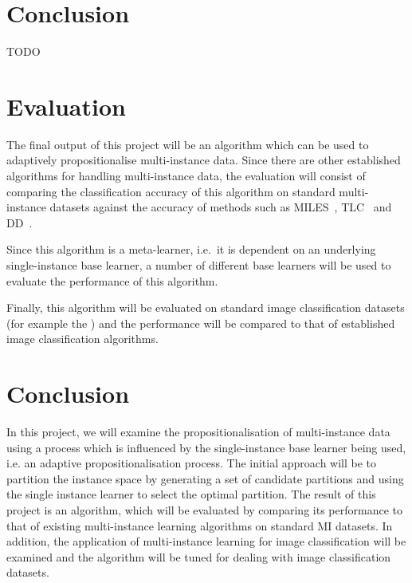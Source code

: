 \documentclass[a4paper,12pt]{article} %
\begin{document}
\section{Conclusion}
TODO


\section{Evaluation}

The final output of this project will be an algorithm which can be used to adaptively propositionalise multi-instance data. Since there are other established algorithms for handling multi-instance data, the evaluation will consist of comparing the classification accuracy of this algorithm on standard multi-instance datasets against the accuracy of methods such as MILES~\cite{Chen2006}, TLC~\cite{Weidmann2003} and DD~\cite{Maron98mil}.

Since this algorithm is a meta-learner, i.e.\ it is dependent on an underlying single-instance base learner, a number of different base learners will be used to evaluate the performance of this algorithm.
 
Finally, this algorithm will be evaluated on standard image classification datasets (for example the ) and the performance will be compared to that of established image classification algorithms.

\section{Conclusion}

In this project, we will examine the propositionalisation of multi-instance data using a process which is influenced by the single-instance base learner being used, i.e. an adaptive propositionalisation process. The initial approach will be to partition the instance space by generating a set of candidate partitions and using the single instance learner to select the optimal partition. 
The result of this project is an algorithm, which will be evaluated by comparing its performance to that of existing multi-instance learning algorithms on standard MI datasets. 
In addition, the application of multi-instance learning for image classification will be examined and the algorithm will be tuned for dealing with image classification datasets.
\clearpage
 

\end{document}
